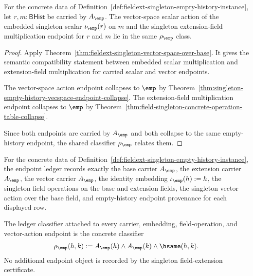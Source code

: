 \begin{theorem}
\label{thm:fieldext-singleton-embedded-scalar-action-collapse}
For the concrete data of
Definition~\ref{def:fieldext-singleton-empty-history-instance}, let
$r,m:\mathsf{BHist}$ be carried by $A_{\emp}$. The vector-space scalar action of
the embedded singleton scalar $\iota_{\emp}(r)$ on $m$ and the singleton
extension-field multiplication endpoint for $r$ and $m$ lie in the same
$\rho_{\emp}$ class.
\end{theorem}
\begin{proof}
Apply Theorem~\ref{thm:fieldext-singleton-vector-space-over-base}. It gives
the semantic compatibility statement between embedded scalar multiplication and
extension-field multiplication for carried scalar and vector endpoints.

The vector-space action endpoint collapses to $\emp$ by
Theorem~\ref{thm:singleton-empty-history-vecspace-endpoint-collapse}. The
extension-field multiplication endpoint collapses to $\emp$ by
Theorem~\ref{thm:field-singleton-concrete-operation-table-collapse}.

Since both endpoints are carried by $A_{\emp}$ and both collapse to the same
empty-history endpoint, the shared classifier $\rho_{\emp}$ relates them.
\end{proof}

\begin{definition}
\label{def:fieldext-singleton-ledger-policy}
For the concrete data of
Definition~\ref{def:fieldext-singleton-empty-history-instance}, the endpoint
ledger records exactly the base carrier $A_{\emp}$, the extension carrier
$A_{\emp}$, the vector carrier $A_{\emp}$, the identity embedding
$\iota_{\emp}(h):=h$, the singleton field operations on the base and
extension fields, the singleton vector action over the base field, and
empty-history endpoint provenance for each displayed row.

The ledger classifier attached to every carrier, embedding, field-operation,
and vector-action endpoint is the concrete classifier
$$
\rho_{\emp}(h,k):=
A_{\emp}(h)\land A_{\emp}(k)\land\hsame(h,k).
$$
No additional endpoint object is recorded by the singleton field-extension
certificate.
\end{definition}

